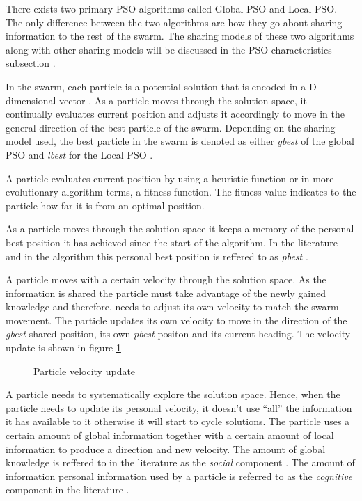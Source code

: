 There exists two primary PSO algorithms called Global PSO and Local PSO. The only difference between the two algorithms are how they go about sharing information to the rest of the swarm. The sharing models of these two algorithms along with other sharing models will be discussed in the PSO characteristics subsection \cite{SOSwarm}.

In the swarm, each particle is a potential solution that is encoded in a D-dimensional vector \cite{PSOHybridJobShop,PSOSelfHierarch}. As a particle moves through the solution space, it continually evaluates current position and adjusts it accordingly to move in the general direction of the best particle of the swarm. Depending on the sharing model used, the best particle in the swarm is denoted as either \emph{gbest} of the global PSO and \emph{lbest} for the Local PSO \cite{SOSwarm,FundamentalSwarm,CompuIntelligenceIntro}. 

A particle evaluates current position by using a heuristic function or in more evolutionary algorithm terms, a fitness function. The fitness value indicates to the particle how far it is from an optimal position. 

As a particle moves through the solution space it keeps a memory of the personal best position it has achieved since the start of the algorithm. In the literature and in the algorithm this personal best position is reffered to as \emph{pbest} \cite{SOSwarm}.

A particle moves with a certain velocity through the solution space. As the information is shared the particle must take advantage of the newly gained knowledge and therefore, needs to adjust its own velocity to match the swarm movement. The particle updates its own velocity to move in the direction of the \emph{gbest} shared position, its own \emph{pbest} positon and its current heading. The velocity update is shown in figure \ref{fig:particleVelocityUpdate} \cite{SOSwarm,FundamentalSwarm,CompuIntelligenceIntro,PSOSelfHierarch}
\begin{figure}[h]
	\centering
	\setlength \fboxsep{0pt}
	\setlength \fboxrule{0.5pt}
	\caption{Particle velocity update}
	\label{fig:particleVelocityUpdate}
\end{figure}

A particle needs to systematically explore the solution space. Hence, when the particle needs to update its personal velocity, it doesn't use ``all'' the information it has available to it otherwise it will start to cycle solutions. The particle uses a certain amount of global information together with a certain amount of local information to produce a direction and new velocity. The amount of global knowledge is reffered to in the literature as the \emph{social} component \cite{FundamentalSwarm,CompuIntelligenceIntro,PSOSelfHierarch,SOSwarm}. The amount of information personal information used by a particle is referred to as the \emph{cognitive} component in the literature \cite{FundamentalSwarm,CompuIntelligenceIntro,PSOSelfHierarch,SOSwarm}.

